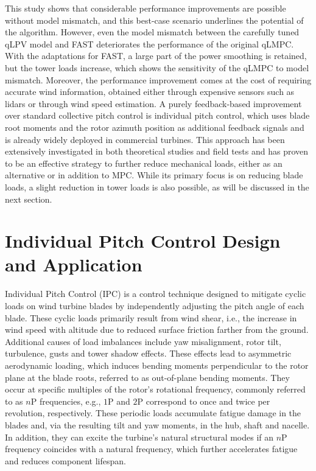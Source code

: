 This study shows that considerable performance improvements are possible without model mismatch, and this best-case scenario underlines the potential of the algorithm. However, even the model mismatch between the carefully tuned qLPV model and FAST deteriorates the performance of the original qLMPC. With the adaptations for FAST, a large part of the power smoothing is retained, but the tower loads increase, which shows the sensitivity of the qLMPC to model mismatch. Moreover, the performance improvement comes at the cost of requiring accurate wind information, obtained either through expensive sensors such as lidars or through wind speed estimation. A purely feedback-based improvement over standard collective pitch control is individual pitch control, which uses blade root moments and the rotor azimuth position as additional feedback signals and is already widely deployed in commercial turbines. This approach has been extensively investigated in both theoretical studies and field tests and has proven to be an effective strategy to further reduce mechanical loads, either as an alternative or in addition to MPC. While its primary focus is on reducing blade loads, a slight reduction in tower loads is also possible, as will be discussed in the next section.

\section{Individual Pitch Control Design and Application}\label{section:Individal Pitch PI Control} 
Individual Pitch Control (IPC) is a control technique designed to mitigate cyclic loads on wind turbine blades by independently adjusting the pitch angle of each blade. These cyclic loads primarily result from wind shear, i.e., the increase in wind speed with altitude due to reduced surface friction farther from the ground. Additional causes of load imbalances include yaw misalignment, rotor tilt, turbulence, gusts and tower shadow effects. These effects lead to asymmetric aerodynamic loading, which induces bending moments perpendicular to the rotor plane at the blade roots, referred to as out-of-plane bending moments. They occur at specific multiples of the rotor's rotational frequency, commonly referred to as $n\text{P}$ frequencies, e.g., $1\text{P}$ and $2\text{P}$ correspond to once and twice per revolution, respectively. These periodic loads accumulate fatigue damage in the blades and, via the resulting tilt and yaw moments, in the hub, shaft and nacelle. In addition, they can excite the turbine's natural structural modes if an $n\text{P}$ frequency coincides with a natural frequency, which further accelerates fatigue and reduces component lifespan.

